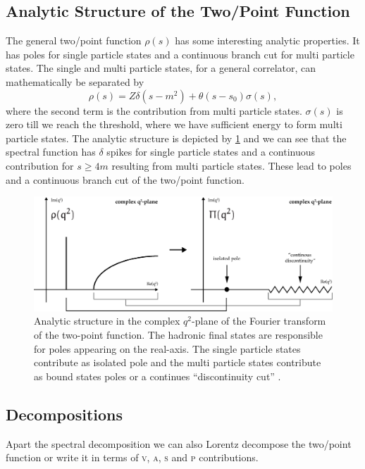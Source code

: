 \documentclass[../../index.tex]{subfiles}
\begin{document}
\subsection{Analytic Structure of the Two\-/Point Function}
The general two\-/point function \(\rho(s)\) has some interesting analytic
properties. It has poles for single particle states and a continuous branch
cut for multi particle states. The single and multi particle states, for a
general correlator, can mathematically be separated by
\begin{equation}
  \rho(s) = Z \delta(s-m^2) + \theta(s-s_0)\sigma(s),
\end{equation}
where the second term is the contribution from multi particle states.
\(\sigma(s)\) is zero till we reach the threshold, where we have sufficient
energy to form multi particle states. The analytic structure is depicted by
\cref{fig:analyticStructureCorrelator} and we can see that the spectral function
has \(\delta\) spikes for single particle states and a continuous
contribution for \(s\geq 4m\) resulting from multi particle states. These lead
to poles and a continuous branch cut of the two\-/point function.
\begin{figure}
  \centering
  \includegraphics[width=\textwidth]{./images/analyticStructureCorrelator.eps}
  \caption{Analytic structure in the complex \(q^2\)-plane of the Fourier
    transform of the two-point function. The hadronic final states are
    responsible for poles appearing on the real-axis. The single particle states
    contribute as isolated pole and the multi particle states contribute as
    bound states poles or a continues ``discontinuity cut''
    \cite{Peskin1995,Zwicky2016}.}
  \label{fig:analyticStructureCorrelator}
\end{figure}

\subsection{Decompositions}
Apart the spectral decomposition we can also Lorentz decompose the two\-/point
function or write it in terms of \textsc{v}, \textsc{a}, \textsc{s} and
\textsc{p} contributions.
\end{document}
